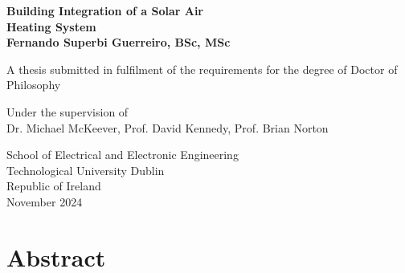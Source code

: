 
\begin{center}
	{\LARGE {\bf Building Integration of a Solar Air \\ Heating System}} \\
	\vspace{2cm}
	{\Large {\bf Fernando Superbi Guerreiro, BSc, MSc}} \\
	\vspace*{1cm}

	{\large A thesis submitted in fulfilment of the requirements for the degree of Doctor of Philosophy}
	
	\vspace*{1cm}
	
	{\large Under the supervision of \\ Dr. Michael McKeever, Prof. David Kennedy,
	    Prof. Brian Norton}
    
    \vspace*{1cm}
    
	{\large	School of Electrical and Electronic Engineering \\
		Technological University Dublin \\
		Republic of Ireland \\
		November 2024 \\}
	
\end{center}

\newpage
\setcounter{page}{1}       
\chapter*{Abstract}
\vspace*{1cm}

